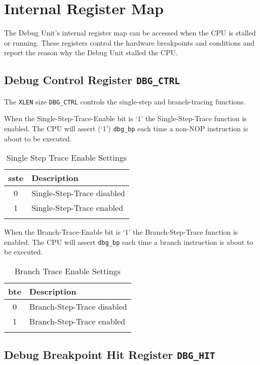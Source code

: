 \section{Internal Register Map}\label{internal-register-map}

The Debug Unit's internal register map can be accessed when the CPU is
stalled or running. These registers control the hardware breakpoints and
conditions and report the reason why the Debug Unit stalled the CPU.

\subsection{Debug Control Register \texttt{DBG\_CTRL}} \label{debug-control-register-dbg_ctrl}

The \texttt{XLEN} size \texttt{DBG\_CTRL} controls the single-step and branch-tracing
functions.



When the Single-Step-Trace-Enable bit is `1' the Single-Step-Trace
function is enabled. The CPU will assert (`1') \texttt{dbg\_bp} each time a
non-NOP instruction is about to be executed.

\begin{longtable}[]{@{}cl@{}}
\toprule
\textbf{sste} & \textbf{Description}\tabularnewline
\midrule
\endhead
0 & Single-Step-Trace disabled\tabularnewline
1 & Single-Step-Trace enabled\tabularnewline
\bottomrule
\caption{Single Step Trace Enable Settings}
\label{tab:single-step-trace-settings}
\end{longtable}

When the Branch-Trace-Enable bit is `1' the Branch-Step-Trace function
is enabled. The CPU will assert \texttt{dbg\_bp} each time a branch instruction
is about to be executed.

\begin{longtable}[]{@{}cl@{}}
\toprule
\textbf{bte} & \textbf{Description}\tabularnewline
\midrule
\endhead
0 & Branch-Step-Trace disabled\tabularnewline
1 & Branch-Step-Trace enabled\tabularnewline
\bottomrule
\caption{Branch Trace Enable Settings}
\label{tab:branch-trace-settings}
\end{longtable}


\subsection{Debug Breakpoint Hit Register \texttt{DBG\_HIT}} \label{debug-breakpoint-hit-register-dbg_hit}



